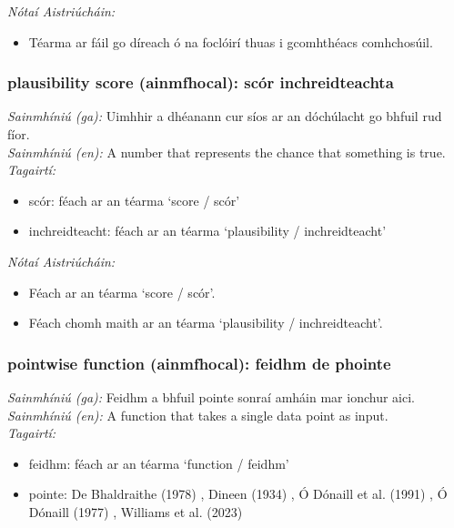  \noindent \textit{Nótaí Aistriúcháin:}
\begin{itemize}
	\item Téarma ar fáil go díreach ó na foclóirí thuas i gcomhthéacs comhchosúil.
\end{itemize}


\subsubsection*{plausibility score (ainmfhocal): scór inchreidteachta}
 \noindent \textit{Sainmhíniú (ga):} Uimhhir a dhéanann cur síos ar an dóchúlacht go bhfuil rud fíor.
\\
 \noindent \textit{Sainmhíniú (en):} A number that represents the chance that something is true.
\\
 \noindent \textit{Tagairtí:}
\begin{itemize}
	\item scór: féach ar an téarma `score / scór'
	\item inchreidteacht: féach ar an téarma `plausibility / inchreidteacht'
\end{itemize}

 \noindent \textit{Nótaí Aistriúcháin:}
\begin{itemize}
	\item Féach ar an téarma `score / scór'.
	\item Féach chomh maith ar an téarma `plausibility / inchreidteacht'.
\end{itemize}


\subsubsection*{pointwise function (ainmfhocal): feidhm de phointe}
 \noindent \textit{Sainmhíniú (ga):} Feidhm a bhfuil pointe sonraí amháin mar ionchur aici.
\\
 \noindent \textit{Sainmhíniú (en):} A function that takes a single data point as input.
\\
 \noindent \textit{Tagairtí:}
\begin{itemize}
	\item feidhm: féach ar an téarma `function / feidhm'
	\item pointe: De Bhaldraithe (1978) \cite{de-bhaldraithe}, Dineen (1934) \cite{dineen}, Ó Dónaill et al. (1991) \cite{focloir-beag}, Ó Dónaill (1977) \cite{odonaill}, Williams et al. (2023) \cite{storchiste}
\end{itemize}

